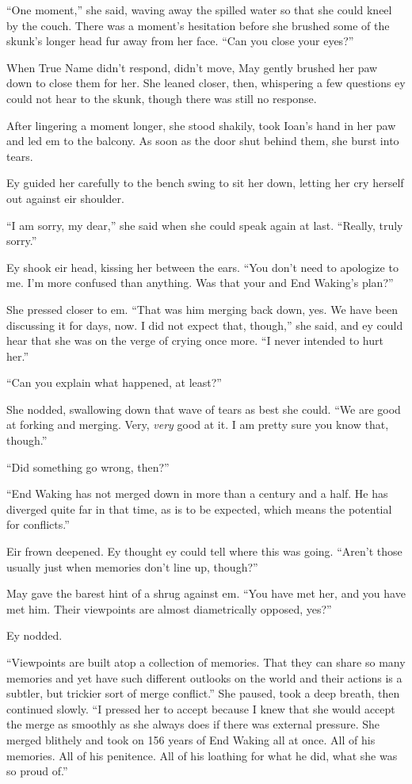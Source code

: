 ``One moment,'' she said, waving away the spilled water so that she could kneel by the couch. There was a moment's hesitation before she brushed some of the skunk's longer head fur away from her face. ``Can you close your eyes?''

When True Name didn't respond, didn't move, May gently brushed her paw down to close them for her. She leaned closer, then, whispering a few questions ey could not hear to the skunk, though there was still no response.

After lingering a moment longer, she stood shakily, took Ioan's hand in her paw and led em to the balcony. As soon as the door shut behind them, she burst into tears.

Ey guided her carefully to the bench swing to sit her down, letting her cry herself out against eir shoulder.

``I am sorry, my dear,'' she said when she could speak again at last. ``Really, truly sorry.''

Ey shook eir head, kissing her between the ears. ``You don't need to apologize to me. I'm more confused than anything. Was that your and End Waking's plan?''

She pressed closer to em. ``That was him merging back down, yes. We have been discussing it for days, now. I did not expect that, though,'' she said, and ey could hear that she was on the verge of crying once more. ``I never intended to hurt her.''

``Can you explain what happened, at least?''

She nodded, swallowing down that wave of tears as best she could. ``We are good at forking and merging. Very, \emph{very} good at it. I am pretty sure you know that, though.''

``Did something go wrong, then?''

``End Waking has not merged down in more than a century and a half. He has diverged quite far in that time, as is to be expected, which means the potential for conflicts.''

Eir frown deepened. Ey thought ey could tell where this was going. ``Aren't those usually just when memories don't line up, though?''

May gave the barest hint of a shrug against em. ``You have met her, and you have met him. Their viewpoints are almost diametrically opposed, yes?''

Ey nodded.

``Viewpoints are built atop a collection of memories. That they can share so many memories and yet have such different outlooks on the world and their actions is a subtler, but trickier sort of merge conflict.'' She paused, took a deep breath, then continued slowly. ``I pressed her to accept because I knew that she would accept the merge as smoothly as she always does if there was external pressure. She merged blithely and took on 156 years of End Waking all at once. All of his memories. All of his penitence. All of his loathing for what he did, what she was so proud of.''

